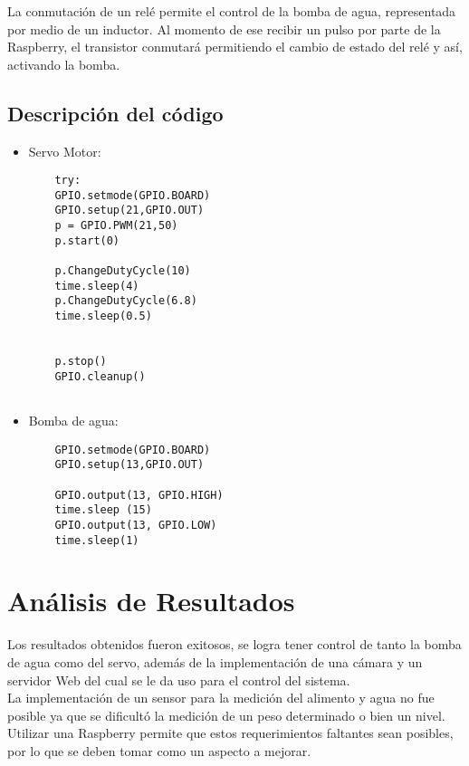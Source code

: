 \documentclass[12pt,letterpaper]{IEEEtran}
\begin{document}
La conmutación de un relé permite el control de la bomba de agua, representada por medio de un inductor. Al momento de ese recibir un pulso por parte de la Raspberry, el transistor conmutará permitiendo el cambio de estado del relé y así, activando la bomba.

\subsection{Descripción del código}
\begin{itemize}
	\item {Servo Motor:}\\
	\begin{verbatim}
	try:
	GPIO.setmode(GPIO.BOARD)
	GPIO.setup(21,GPIO.OUT)
	p = GPIO.PWM(21,50)
	p.start(0)
	
	p.ChangeDutyCycle(10)
	time.sleep(4)
	p.ChangeDutyCycle(6.8)
	time.sleep(0.5)
	
	
	p.stop()
	GPIO.cleanup()
	
	\end{verbatim}
	\item{Bomba de agua:}\\
	\begin{verbatim}
	GPIO.setmode(GPIO.BOARD)   
	GPIO.setup(13,GPIO.OUT)   
	
	GPIO.output(13, GPIO.HIGH)
	time.sleep (15)
	GPIO.output(13, GPIO.LOW)
	time.sleep(1)
	\end{verbatim}
\end{itemize}

\section{Análisis de Resultados}
Los resultados obtenidos fueron exitosos, se logra tener control de tanto la bomba de agua como del servo, además de la implementación de una cámara y un servidor Web del cual se le da uso para el control del sistema.\\
La implementación de un sensor para la medición del alimento y agua no fue posible ya que se dificultó la medición de un peso determinado o bien un nivel.\\
Utilizar una Raspberry permite que estos requerimientos faltantes sean posibles, por lo que se deben tomar como un aspecto a mejorar.
\end{document}
